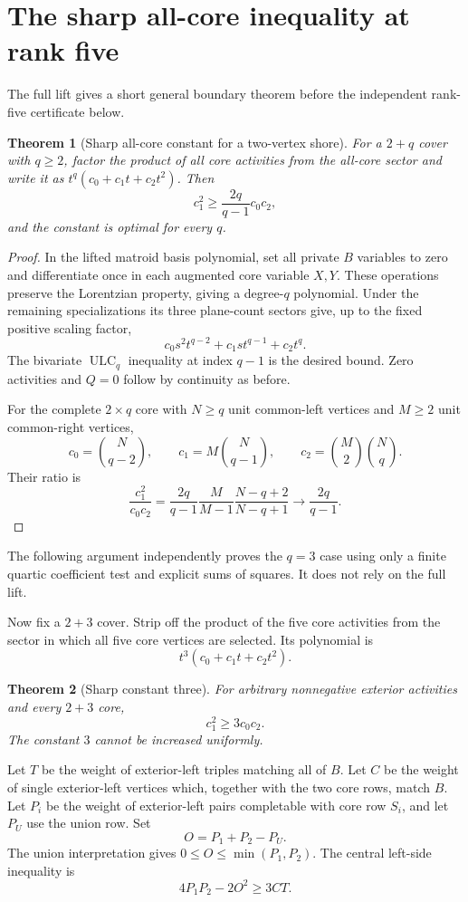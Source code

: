 \documentclass[11pt,a4paper]{article}
\newtheorem{theorem}{Theorem}[section]
\theoremstyle{remark}\newtheorem{remark}[theorem]{Remark}
\newcommand{\ULC}{\operatorname{ULC}}      %
\begin{document}
\section{The sharp all-core inequality at rank five}\label{mrn:w:rf:sec:forcedcore}
The full lift gives a short general boundary theorem before the independent rank-five certificate below.
\begin{theorem}[Sharp all-core constant for a two-vertex shore]\label{mrn:w:rf:thm:generalcore}
For a $2+q$ cover with $q\ge2$, factor the product of all core activities from the all-core sector and write it as $t^q(c_0+c_1t+c_2t^2)$. Then
\[
 c_1^2\ge\frac{2q}{q-1}c_0c_2,
\]
and the constant is optimal for every $q$.
\end{theorem}
\begin{proof}
In the lifted matroid basis polynomial, set all private $B$ variables to zero and differentiate once in each augmented core variable $X,Y$. These operations preserve the Lorentzian property, giving a degree-$q$ polynomial. Under the remaining specializations its three plane-count sectors give, up to the fixed positive scaling factor,
\[
 c_0s^2t^{q-2}+c_1st^{q-1}+c_2t^q.
\]
The bivariate $\ULC_q$ inequality at index $q-1$ is the desired bound. Zero activities and $Q=0$ follow by continuity as before.

For the complete $2\times q$ core with $N\ge q$ unit common-left vertices and $M\ge2$ unit common-right vertices,
\[
 c_0=\binom N{q-2},\qquad c_1=M\binom N{q-1},\qquad
 c_2=\binom M2\binom Nq.
\]
Their ratio is
\[
 \frac{c_1^2}{c_0c_2}
 =\frac{2q}{q-1}\frac{M}{M-1}\frac{N-q+2}{N-q+1}
 \longrightarrow\frac{2q}{q-1}.
\]
\end{proof}

The following argument independently proves the $q=3$ case using only a finite quartic coefficient test and explicit sums of squares. It does not rely on the full lift.

Now fix a $2+3$ cover. Strip off the product of the five core activities from the sector in which all five core vertices are selected. Its polynomial is
\[
 t^3(c_0+c_1t+c_2t^2).
\]
\begin{theorem}[Sharp constant three]\label{mrn:w:rf:thm:three}
For arbitrary nonnegative exterior activities and every $2+3$ core,
\[
 c_1^2\ge3c_0c_2.
\]
The constant $3$ cannot be increased uniformly.
\end{theorem}

Let $T$ be the weight of exterior-left triples matching all of $B$. Let $C$ be the weight of single exterior-left vertices which, together with the two core rows, match $B$. Let $P_i$ be the weight of exterior-left pairs completable with core row $S_i$, and let $P_U$ use the union row. Set
\[
 O=P_1+P_2-P_U.
\]
The union interpretation gives $0\le O\le\min(P_1,P_2)$. The central left-side inequality is
\begin{equation}\label{mrn:w:rf:eq:leftkey}
 4P_1P_2-2O^2\ge3CT.
\end{equation}
\end{document}
